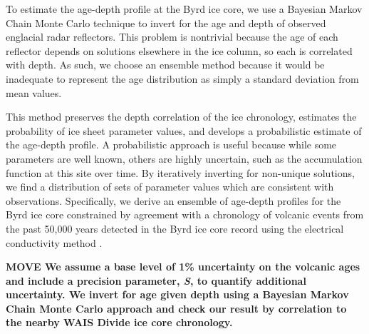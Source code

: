 


To estimate the age-depth profile at the Byrd ice core, we use a Bayesian Markov Chain Monte Carlo technique to invert for the age and depth of observed englacial radar reflectors. This problem is nontrivial because the age of each reflector depends on solutions elsewhere in the ice column, so each is correlated with depth. As such, we choose an ensemble method because it would be inadequate to represent the age distribution as simply a standard deviation from mean values.

This method preserves the depth correlation of the ice chronology, estimates the probability of ice sheet parameter values, and develops a probabilistic estimate of the age-depth profile. A probabilistic approach is useful because while some parameters are well known, others are highly uncertain, such as the accumulation function at this site over time. By iteratively inverting for non-unique solutions, we find a distribution of sets of parameter values which are consistent with observations. Specifically, we derive an ensemble of age-depth profiles for the Byrd ice core constrained by agreement with a chronology of volcanic events from the past 50,000 years detected in the Byrd ice core record using the electrical conductivity method \citep{hammer1997}. 



\textbf{MOVE We assume a base level of 1\% uncertainty on the volcanic ages and include a precision parameter, \textit{S}, to quantify additional uncertainty. We invert for age given depth using a Bayesian Markov Chain Monte Carlo approach and check our result by correlation to the nearby WAIS Divide ice core chronology.}

